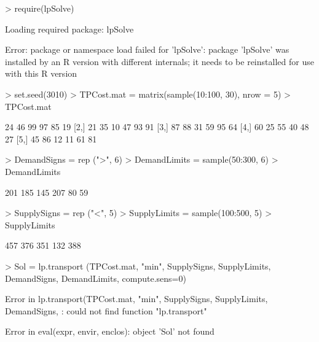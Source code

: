 \begin{Schunk}
\begin{Sinput}
> require(lpSolve)
\end{Sinput}
\begin{Soutput}
Loading required package: lpSolve
\end{Soutput}
\begin{Soutput}
Error: package or namespace load failed for 'lpSolve':
 package 'lpSolve' was installed by an R version with different internals; it needs to be reinstalled for use with this R version
\end{Soutput}
\begin{Sinput}
> set.seed(3010)
> TPCost.mat = matrix(sample(10:100, 30), nrow = 5)
> TPCost.mat
\end{Sinput}
\begin{Soutput}
     [,1] [,2] [,3] [,4] [,5] [,6]
[1,]   24   46   99   97   85   19
[2,]   21   35   10   47   93   91
[3,]   87   88   31   59   95   64
[4,]   60   25   55   40   48   27
[5,]   45   86   12   11   61   81
\end{Soutput}
\begin{Sinput}
> DemandSigns = rep (">", 6)
> DemandLimits = sample(50:300, 6)
> DemandLimits
\end{Sinput}
\begin{Soutput}
[1] 201 185 145 207  80  59
\end{Soutput}
\begin{Sinput}
> SupplySigns = rep ("<", 5)
> SupplyLimits = sample(100:500, 5)
> SupplyLimits
\end{Sinput}
\begin{Soutput}
[1] 457 376 351 132 388
\end{Soutput}
\begin{Sinput}
> Sol = lp.transport (TPCost.mat, "min", SupplySigns, SupplyLimits, DemandSigns, DemandLimits, compute.sens=0)
\end{Sinput}
\begin{Soutput}
Error in lp.transport(TPCost.mat, "min", SupplySigns, SupplyLimits, DemandSigns, : could not find function "lp.transport"
\end{Soutput}
\begin{Soutput}
Error in eval(expr, envir, enclos): object 'Sol' not found
\end{Soutput}
\end{Schunk}

